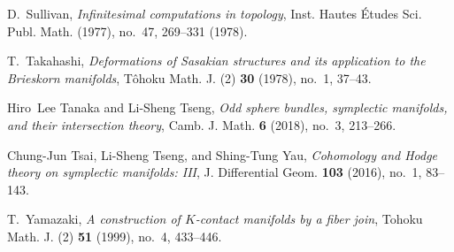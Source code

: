 \documentclass[12pt]{amsart}
\begin{document}
\begin{thebibliography}{ACGTF08}
D.~Sullivan, \emph{Infinitesimal computations in topology}, Inst. Hautes
  \'Etudes Sci. Publ. Math. (1977), no.~47, 269--331 (1978). 

T.~Takahashi, \emph{Deformations of {S}asakian structures and its application
  to the {B}rieskorn manifolds}, T\^ohoku Math. J. (2) \textbf{30} (1978),
  no.~1, 37--43. 

Hiro~Lee Tanaka and Li-Sheng Tseng, \emph{Odd sphere bundles, symplectic
  manifolds, and their intersection theory}, Camb. J. Math. \textbf{6} (2018),
  no.~3, 213--266. 

Chung-Jun Tsai, Li-Sheng Tseng, and Shing-Tung Yau, \emph{Cohomology and
  {H}odge theory on symplectic manifolds: {III}}, J. Differential Geom.
  \textbf{103} (2016), no.~1, 83--143. 

T.~Yamazaki, \emph{A construction of {$K$}-contact manifolds by a fiber join},
  Tohoku Math. J. (2) \textbf{51} (1999), no.~4, 433--446. 

\end{thebibliography}
\end{document}
